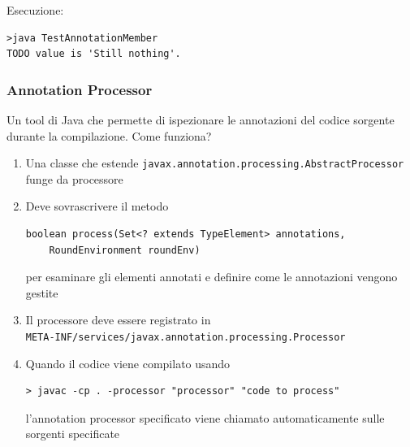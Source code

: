 Esecuzione:
\begin{verbatim}
>java TestAnnotationMember
TODO value is 'Still nothing'.
\end{verbatim}

\subsubsection{Annotation Processor}

Un tool di Java che permette di ispezionare le annotazioni del codice sorgente durante la compilazione. Come funziona?
\begin{enumerate}
    \item Una classe che estende \texttt{javax.annotation.processing.AbstractProcessor} funge da processore

    \item Deve sovrascrivere il metodo
    \begin{verbatim}
boolean process(Set<? extends TypeElement> annotations,
    RoundEnvironment roundEnv)
    \end{verbatim}
    per esaminare gli elementi annotati e definire come le annotazioni vengono gestite

    \item Il processore deve essere registrato in \\
    \texttt{META-INF/services/javax.annotation.processing.Processor}

    \item Quando il codice viene compilato usando
    \begin{verbatim}
> javac -cp . -processor "processor" "code to process"
    \end{verbatim}
    l'annotation processor specificato viene chiamato automaticamente sulle sorgenti specificate
\end{enumerate}

